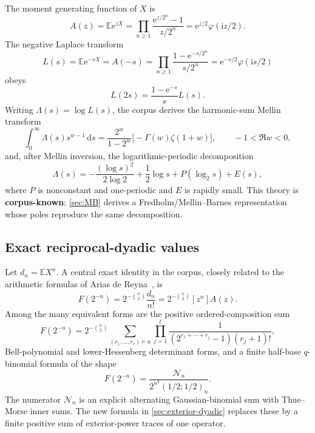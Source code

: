 \documentclass[11pt,oneside]{article}
\theoremstyle{definition}
\newcommand{\dd}{\,\mathrm d}
\newcommand{\e}{\mathrm e}
\newcommand{\ii}{\mathrm i}
\newcommand{\E}{\mathbb E}
\newcommand{\phiF}{\varphi}
\newcommand{\CorpusKnown}{\textcolor{linkblue}{\textbf{corpus-known}}}
\begin{document}
The moment generating function of \(X\) is
\begin{equation}
 A(z)=\E\e^{zX}
 =\prod_{n\ge1}\frac{\e^{z/2^n}-1}{z/2^n}
 =\e^{z/2}\phiF(\ii z/2).
 \label{eq:A-product}
\end{equation}
The negative Laplace transform
\begin{equation}
 L(s)=\E\e^{-sX}=A(-s)
 =\prod_{n\ge1}\frac{1-\e^{-s/2^n}}{s/2^n}
 =\e^{-s/2}\phiF(\ii s/2)
 \label{eq:L-product}
\end{equation}
obeys
\begin{equation}
 L(2s)=\frac{1-\e^{-s}}{s}L(s).
 \label{eq:L-scaling}
\end{equation}
Writing \(\Lambda(s)=\log L(s)\), the corpus derives the harmonic-sum Mellin transform
\begin{equation}
 \int_0^\infty \Lambda(s)s^{w-1}\dd s
 =\frac{2^w}{1-2^w}\bigl[-\Gamma(w)\zeta(1+w)\bigr],
 \qquad -1<\Re w<0,
 \label{eq:known-Mellin}
\end{equation}
and, after Mellin inversion, the logarithmic-periodic decomposition
\begin{equation}
 \Lambda(s)=-\frac{(\log s)^2}{2\log2}+\frac12\log s
 +P(\log_2s)+E(s),
 \label{eq:endpoint-periodic}
\end{equation}
where \(P\) is nonconstant and one-periodic and \(E\) is rapidly small.  This theory is
\CorpusKnown{}; \cref{sec:MB} derives a Fredholm/Mellin--Barnes representation whose
poles reproduce the same decomposition.

\subsection{Exact reciprocal-dyadic values}

Let \(d_n=\E X^n\).  A central exact identity in the corpus, closely related to the arithmetic formulas of
Arias de Reyna~\cite{Arias2018}, is
\begin{equation}
 \boxed{\quad
 F(2^{-n})=2^{-\binom n2}\frac{d_n}{n!}
 =2^{-\binom n2}[z^n]A(z).
 \quad}
 \label{eq:dyadic-moment}
\end{equation}
Among the many equivalent forms are the positive ordered-composition sum
\begin{equation}
 F(2^{-n})=2^{-\binom n2}
 \sum_{(r_1,\ldots,r_\ell)\vDash n}
 \prod_{j=1}^{\ell}
 \frac1{(2^{r_1+\cdots+r_j}-1)(r_j+1)!},
 \label{eq:ordered-composition}
\end{equation}
Bell-polynomial and lower-Hessenberg determinant forms, and a finite half-base
\(q\)-binomial formula of the shape
\begin{equation}
 F(2^{-n})=\frac{\mathcal N_n}{2^{n^2}(1/2;1/2)_n}.
 \label{eq:q-shape}
\end{equation}
The numerator \(\mathcal N_n\) is an explicit alternating Gaussian-binomial sum with
Thue--Morse inner sums.  The new formula in \cref{sec:exterior-dyadic} replaces these
by a finite positive sum of exterior-power traces of one operator.
\end{document}
